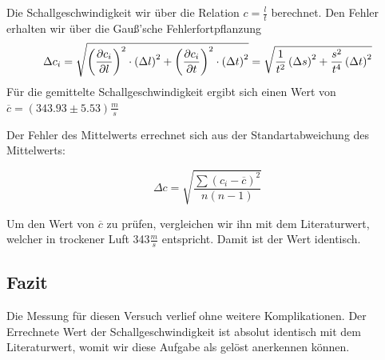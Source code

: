 Die Schallgeschwindigkeit wir über die Relation \(c=\frac{l}{t}\) berechnet. Den Fehler erhalten wir über die Gauß'sche Fehlerfortpflanzung
\begin{equation}
\notag
\Delta c_i = \sqrt{\left(\frac{\partial c_i}{\partial l}\right)^2\cdot \left(\Delta l\right)^2+\left(\frac{\partial c_i}{\partial t}\right)^2\cdot \left(\Delta t\right)^2}=\sqrt{\frac{1}{t^2}\left(\Delta s\right)^2+\frac{s^2}{t^4}\left(\Delta t\right)^2}
\end{equation}
Für die gemittelte Schallgeschwindigkeit ergibt sich einen Wert von\\
\(\overline{c}=(343.93 \pm 5.53)\frac{m}{s}\)

Der Fehler des Mittelwerts errechnet sich aus der Standartabweichung des Mittelwerts:

\begin{equation}
\Delta c=\sqrt{\frac{\sum (c_i-\overline{c})^2}{n(n-1)}}
\end{equation}

Um den Wert von \(\overline{c}\) zu prüfen, vergleichen wir ihn mit dem Literaturwert, welcher in trockener Luft 343\(\frac{m}{s}\) entspricht. Damit ist der Wert identisch.

\subsection{Fazit}
Die Messung für diesen Versuch verlief ohne weitere Komplikationen. Der Errechnete Wert der Schallgeschwindigkeit ist absolut identisch mit dem Literaturwert, womit wir diese Aufgabe als gelöst anerkennen können.